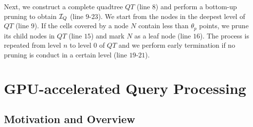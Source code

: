 \documentclass[10pt,conference,letterpaper]{IEEEtran}
\newcommand{\frname}{GAT\xspace }
\newcommand{\idxname}{GTIDX\xspace }
\newcommand{\trajtable}{{\cal S}\xspace}
\newcommand{\treeindex}{{{\cal I}_Q}\xspace}
\begin{document}

Next, we construct a complete quadtree $QT$ (line $8$) and perform a bottom-up pruning to obtain $\treeindex$ (line $9$-$23$). We start from the nodes in the deepest level of $QT$ (line $9$). If the cells covered by a node $N$ contain less than $\theta_p$ points, we prune its child nodes in $QT$ (line $15$) and mark $N$ as a leaf node (line $16$). The process is repeated from level $n$ to level $0$ of $QT$ and we perform early termination if no pruning is conduct in a certain level (line $19$-$21$).




\section{GPU-accelerated Query Processing}\label{sec:query}


\subsection{Motivation and Overview}
\end{document}

